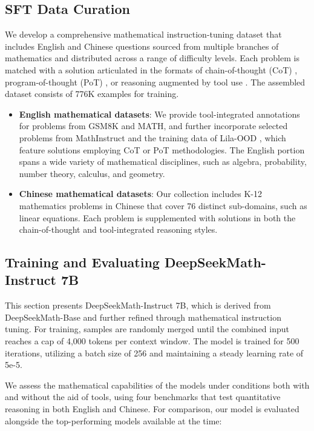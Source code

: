 \subsection{SFT Data Curation}

We develop a comprehensive mathematical instruction-tuning dataset that includes English and Chinese questions sourced from multiple branches of mathematics and distributed across a range of difficulty levels. Each problem is matched with a solution articulated in the formats of chain-of-thought (CoT) \citep{cot}, program-of-thought (PoT) \citep{pot,pal}, or reasoning augmented by tool use \citep{tora}. The assembled dataset consists of 776K examples for training.

\begin{itemize}[topsep=0pt]
    \item \textbf{English mathematical datasets}: We provide tool-integrated annotations for problems from GSM8K and MATH, and further incorporate selected problems from MathInstruct \citep{MathInstruct} and the training data of Lila-OOD \citep{lila}, which feature solutions employing CoT or PoT methodologies. The English portion spans a wide variety of mathematical disciplines, such as algebra, probability, number theory, calculus, and geometry.
    \item \textbf{Chinese mathematical datasets}: Our collection includes K-12 mathematics problems in Chinese that cover 76 distinct sub-domains, such as linear equations. Each problem is supplemented with solutions in both the chain-of-thought and tool-integrated reasoning styles.
\end{itemize}

\subsection{Training and Evaluating DeepSeekMath-Instruct 7B}

This section presents DeepSeekMath-Instruct 7B, which is derived from DeepSeekMath-Base and further refined through mathematical instruction tuning. For training, samples are randomly merged until the combined input reaches a cap of 4,000 tokens per context window. The model is trained for 500 iterations, utilizing a batch size of 256 and maintaining a steady learning rate of 5e-5.

We assess the mathematical capabilities of the models under conditions both with and without the aid of tools, using four benchmarks that test quantitative reasoning in both English and Chinese. For comparison, our model is evaluated alongside the top-performing models available at the time:

